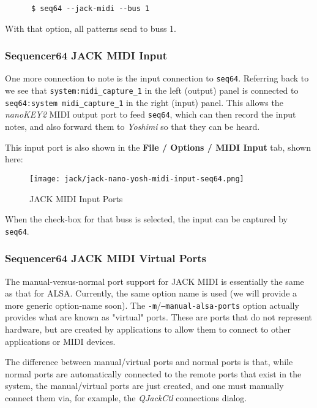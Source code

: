    \begin{verbatim}
      $ seq64 --jack-midi --bus 1
   \end{verbatim}

   With that option, all patterns send to buss 1.

\subsubsection{Sequencer64 JACK MIDI Input}
\label{subsubsec:seq64_jack_midi_input}

   One more connection to note is the input connection to \texttt{seq64}.
   Referring back to 
   we see that
   \texttt{system:midi\_capture\_1} in the left (output) panel is connected to
   \texttt{seq64:system midi\_capture\_1} in the right (input) panel.
   This allows the \textsl{nanoKEY2} MIDI output port to feed \texttt{seq64},
   which can then record the input notes, and also forward them to
   \textsl{Yoshimi} so that they can be heard.

   This input port is also shown in the \textbf{File / Options / MIDI Input}
   tab, shown here:

\begin{figure}[H]
   \centering 
   \texttt{[image: jack/jack-nano-yosh-midi-input-seq64.png]}
   \caption{JACK MIDI Input Ports}
   \label{fig:seq64_jack_nano_yosh_midi_input}
\end{figure}

   When the check-box for that buss is selected, the input can be captured by
   \texttt{seq64}.

\subsubsection{Sequencer64 JACK MIDI Virtual Ports}
\label{subsubsec:seq64_jack_midi_virtual_ports}

   The manual-versus-normal port support for JACK MIDI is essentially the same
   as that for ALSA.  Currently, the same option name is used (we will provide
   a more generic option-name soon).
   The \texttt{-m}/\texttt{--manual-alsa-ports} option actually provides what
   are known as "virtual" ports.  These are ports that do not represent
   hardware, but are created by applications to allow them to connect to other
   applications or MIDI devices.

   The difference between manual/virtual ports and normal ports is that, while
   normal ports are automatically connected to the remote ports that exist in
   the system, the manual/virtual ports are just created, and one must
   manually connect them via, for example, the
   \textsl{QJackCtl} connections dialog.

